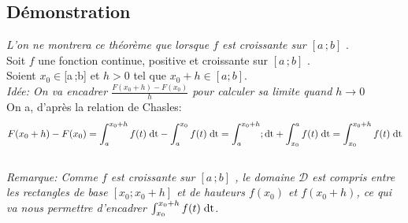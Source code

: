 \documentclass[12px]{article}
\newcommand\I{$[a\,;b]$ }
\begin{document}
	\subsection{Démonstration}
	\emph{L'on ne montrera ce théorème que lorsque $f$ est croissante sur \I}.\\
	
	Soit $f$ une fonction continue, positive et croissante sur \I.\\
	Soient $x_0\in\I$ et $h>0$ tel que $x_0+h \in [a;b]$.\\
	
	\emph{Idée: On va encadrer $\frac{F( x_0 +h) - F(x_0) }{h}$ pour calculer sa limite quand $h \rightarrow 0$}\\
		
	On a, d'après la relation de Chasles:\\
	\begin{displaymath}
		F( x_0 +h ) - F(x_0) = \int_{a}^{x_0 +h}f(t)\; \mathrm{dt} - \int_{a}^{x_0} f(t)\; \mathrm{dt} = 
		\int_{a}^{ x_0 +h };\mathrm{dt} + \int_{x_0}^{a}f(t)\; \mathrm{dt} = \int_{x_0}^{x_0 +h} f(t)\; \mathrm{dt}
	\end{displaymath}
	\\
		
	\emph{Remarque: Comme $f$ est croissante sur \I, le domaine $\mathcal{D}$ est compris entre les rectangles de base $[x_0; x_0 +h]$ et de hauteurs $f(x_0)$ et $f(x_0 +h)$, ce qui va nous permettre d'encadrer $\int_{x_0}^{x_0 +h}f(t)\; \mathrm{dt}$.}\\
	
\end{document}
